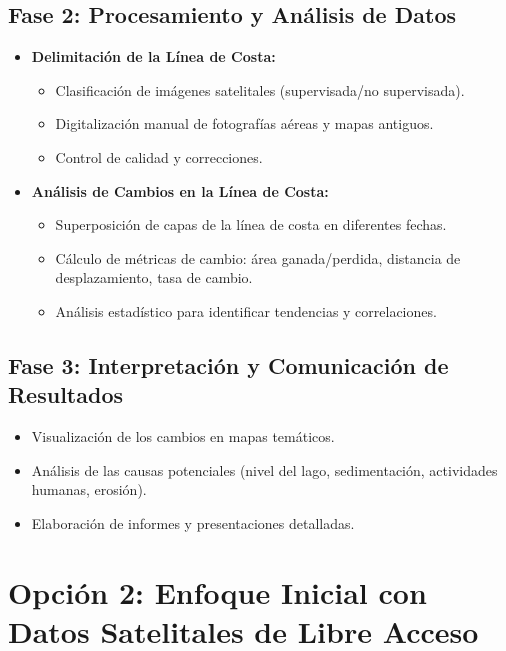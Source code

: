 \documentclass{article}
\begin{document}
\subsection*{Fase 2: Procesamiento y Análisis de Datos}

\begin{itemize}
    \item \textbf{Delimitación de la Línea de Costa:}
    \begin{itemize}
        \item Clasificación de imágenes satelitales (supervisada/no supervisada).
        \item Digitalización manual de fotografías aéreas y mapas antiguos.
        \item Control de calidad y correcciones.
    \end{itemize}
    \item \textbf{Análisis de Cambios en la Línea de Costa:}
    \begin{itemize}
        \item Superposición de capas de la línea de costa en diferentes fechas.
        \item Cálculo de métricas de cambio: área ganada/perdida, distancia de desplazamiento, tasa de cambio.
        \item Análisis estadístico para identificar tendencias y correlaciones.
    \end{itemize}
\end{itemize}

\subsection*{Fase 3: Interpretación y Comunicación de Resultados}

\begin{itemize}
    \item Visualización de los cambios en mapas temáticos.
    \item Análisis de las causas potenciales (nivel del lago, sedimentación, actividades humanas, erosión).
    \item Elaboración de informes y presentaciones detalladas.
\end{itemize}

\section*{Opción 2: Enfoque Inicial con Datos Satelitales de Libre Acceso}
\end{document}
